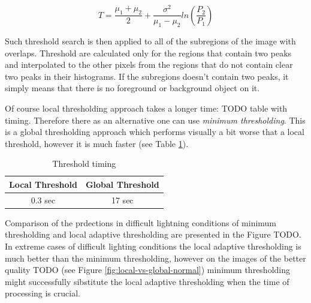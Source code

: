 \begin{equation}
    T = \frac{\mu_1 + \mu_2}{2} + \frac{\sigma^2}{\mu_1 - \mu_2}ln\left(\frac{P_2}{P_1}\right)
\end{equation}

Such threshold search is then applied to all of the subregions of the image with overlaps. Threshold are calculated only for the regions that contain two peaks and interpolated to the other pixels from the regions that do not contain clear two peaks in their histograms. If the subregions doesn't contain two peaks, it simply means that there is no foreground or background object on it. 

Of course local thresholding approach takes a longer time:
TODO table with timing. Therefore there as an alternative one can use \textit{minimum thresholding}. This is a global thresholding approach which performs visually a bit worse that a local threshold, however it is much faster (see Table \ref{tab:threshold-timing}).

\begin{table}
\centering
    \begin{tabular}{||c c||} 
     \hline
     Local Threshold & Global Threshold \\ [0.5ex] 
     \hline\hline
     0.3 sec & 17 sec  \\ 
     \hline
    \end{tabular}
    \caption{Threshold timing}
    \label{tab:threshold-timing}
\end{table}

Comparison of the prdections in difficult lightning conditions of minimum thresholding and local adaptive thresholding are presented in the Figure TODO. In extreme cases of difficult lighting conditions the local adaptive thresholding is much better than the minimum thresholding, however on the images of the better quality TODO (see Figure \ref{fig:local-vs-global-normal}) minimum thresholding might successfully sibstitute the local adaptive thresholding when the time of processing is crucial.


